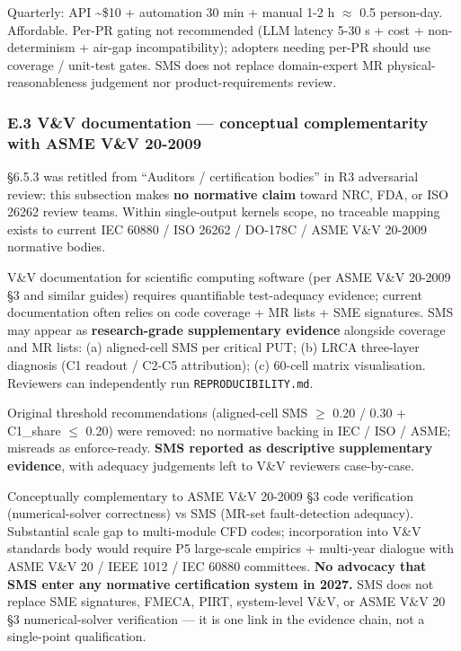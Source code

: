 \documentclass[review,12pt,authoryear]{elsarticle}
\begin{document}
Quarterly: API \textasciitilde\$10 + automation 30 min + manual 1-2 h $\approx$
0.5 person-day. Affordable. Per-PR gating not recommended (LLM latency
5-30 s + cost + non-determinism + air-gap incompatibility); adopters
needing per-PR should use coverage / unit-test gates. SMS does not
replace domain-expert MR physical-reasonableness judgement nor
product-requirements review.

\subsubsection{E.3 V\&V documentation --- conceptual complementarity with ASME V\&V 20-2009}\label{e.3-vv-documentation-conceptual-complementarity-with-asme-vv-20-2009}

§6.5.3 was retitled from ``Auditors / certification bodies'' in R3
adversarial review: this subsection makes \textbf{no normative claim} toward NRC,
FDA, or ISO 26262 review teams. Within single-output kernels scope, no
traceable mapping exists to current IEC 60880 / ISO 26262 / DO-178C /
ASME V\&V 20-2009 normative bodies.

V\&V documentation for scientific computing software (per ASME V\&V
20-2009 §3 and similar guides) requires quantifiable test-adequacy
evidence; current documentation often relies on code coverage + MR lists
+ SME signatures. SMS may appear as \textbf{research-grade supplementary
evidence} alongside coverage and MR lists: (a) aligned-cell SMS per
critical PUT; (b) LRCA three-layer diagnosis (C1 readout / C2-C5
attribution); (c) 60-cell matrix visualisation. Reviewers can
independently run \texttt{REPRODUCIBILITY.md}.

Original threshold recommendations (aligned-cell SMS $\geq$ 0.20 / 0.30 +
C1\_share $\leq$ 0.20) were removed: no normative backing in IEC / ISO /
ASME; misreads as enforce-ready. \textbf{SMS reported as descriptive
supplementary evidence}, with adequacy judgements left to V\&V reviewers
case-by-case.

Conceptually complementary to ASME V\&V 20-2009 §3 code verification
(numerical-solver correctness) vs SMS (MR-set fault-detection adequacy).
Substantial scale gap to multi-module CFD codes; incorporation into V\&V
standards body would require P5 large-scale empirics + multi-year
dialogue with ASME V\&V 20 / IEEE 1012 / IEC 60880 committees.
\textbf{No advocacy that SMS enter any normative certification system in
2027.} SMS does not replace SME signatures, FMECA, PIRT, system-level
V\&V, or ASME V\&V 20 §3 numerical-solver verification --- it is one
link in the evidence chain, not a single-point qualification.
\end{document}

